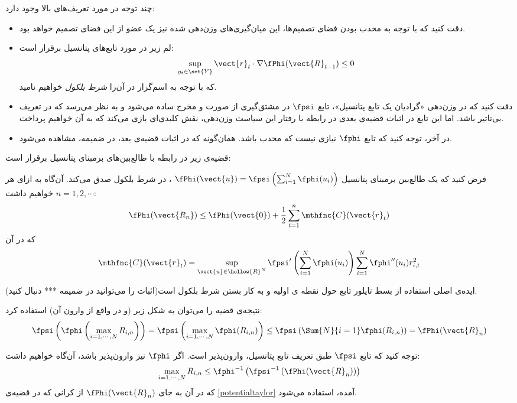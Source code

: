 \documentclass[a4paper,11px]{article}
\begin{document}
چند توجه در مورد تعریف‌های بالا وجود دارد:
\begin{itemize}
\item 
دقت کنید که با توجه به محدب بودن فضای تصمیم‌ها، این میان‌گیری‌های وزن‌دهی شده نیز یک عضو از این فضای تصمیم خواهد بود.
\item 
لم زیر در مورد تابع‌های پتانسیل برقرار است:
\[
\sup_{y_t \in \set{Y}} \vect{r}_t \cdot \nabla \fPhi( \vect{R}_{t-1} ) \leq 0
\]
که با توجه به اسم‌گزار در 
\cite{asdsda} 
آن‌را 
\textit{
شرط بلکول
} 
خواهیم نامید.

\item 
دقت کنید که در وزن‌دهی «گرادیان یک تابع پتانسیل»، تابع 
$\fpsi$ 
در مشتق‌گیری از صورت و مخرج ساده می‌شود و به نظر می‌رسد که در تعریف بی‌تاثیر باشد. اما این تابع در اثبات قضیه‌ی بعدی در رابطه با رفتار این سیاست وزن‌دهی، نقش کلیدی‌ای بازی می‌کند که به آن خواهیم پرداخت.

\item 
در آخر، توجه کنید که تابع 
$\fphi$ 
نیازی نیست که محدب باشد. همان‌گونه که در اثبات قضیه‌ی بعد، در ضمیمه، مشاهده می‌شود.
\end{itemize}

قضیه‌ی زیر در رابطه با طالع‌بین‌های برمبنای پتانسیل برقرار است:
\begin{theorem}
\label{potentialtaylor}
فرض کنید که یک طالع‌بین برمبنای پتانسیل 
$\fPhi( \vect{u} ) = \fpsi \left( \sum^{N}_{i=1} \fphi( u_i ) \right)$
، در شرط بلکول صدق می‌کند. آن‌گاه به ازای هر 
$n = 1,2, \cdots$ 
خواهیم داشت:
\[
\fPhi( \vect{R_n} ) \leq \fPhi( \vect{0} ) + \frac{1}{2} \sum^{n}_{t=1} \mthfnc{C}( \vect{r}_t )
\]
که در آن
\[
\mthfnc{C}( \vect{r}_t ) = \sup_{ \vect{u} \in \hollow{R}^N } \fpsi^\prime \left( \sum^{N}_{i=1} \fphi( u_i ) \right) \sum^{N}_{i=1} \fphi^{\prime\prime} (u_i) r^{2}_{i,t}
\]
\end{theorem}

ایده‌ی اصلی استفاده از بسط تایلور تابع حول نقطه ی اولیه و به کار بستن شرط بلکول است(اثبات را می‌توانید در ضمیمه *** دنبال کنید).

نتیجه‌ی قضیه را می‌توان به شکل زیر (و در واقع از وارون آن) استفاده کرد:
\[
\fpsi \left( \fphi \left( \max_{i=1,\cdots,N} R_{i,n} \right) \right) = \fpsi \left( \max_{i=1,\cdots,N} \fphi (R_{i,n}) \right) \leq \fpsi \left( \Sum{N}{i=1} \fphi (R_{i,n}) \right) = \fPhi( \vect{R}_n )
\]

توجه کنید که تابع 
$\fpsi$ 
طبق تعریف تابع پتانسیل، وارون‌پذیر است. اگر 
$\fphi$ 
نیز وارون‌پذیر باشد، آن‌گاه خواهیم داشت:
\[
\max_{i=1,\cdots,N} R_{i,n} \leq \fphi^{-1} \left( \fpsi^{-1} \left( \fPhi( \vect{R}_n ) \right) \right)
\]
که در آن به جای 
$\fPhi (\vect{R}_n)$ 
از کرانی که در قضیه‌ی 
\ref{potentialtaylor} 
آمده، استفاده می‌شود.
\end{document}
